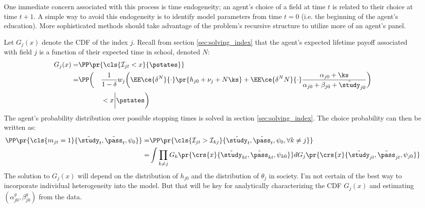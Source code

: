 One immediate concern associated with this process is time endogeneity; an agent's choice of a field at time $t$ is related to their choice at time $t+1$. A simple way to avoid this endogeneity is to identify model parameters from time $t=0$ (i.e. the beginning of the agent's education).
More sophisticated methods should take advantage of the problem's recursive structure to utilize more of an agent's panel. 

Let $G_j (x)$ denote the CDF of the index $j$. Recall from section \ref{sec:solving_index} that the agent's expected lifetime payoff associated with field $j$ is a function of their expected time in school, denoted $N$:
\begin{alignat*}{3}
    G_j(x) =& \PP \pr{\cls{\mathcal{I}_{jt} < x}{\pstates}} \span \span
    \\
    =&
    \PP \bigg(
        &&\frac{1}{1 - \delta} w_j
        \bigg(
            \EE \ce{\delta^N}{\cdot} 
            \pr{h_{j0} + \nu_j + N \ks}
            + 
            \EE \ce{\delta^N N}{\cdot} 
            \frac{\alpha_{j0} + \ks}{\alpha_{j0} + \beta_{j0} + \tilde{\study}_{j0}}
        \bigg) \\
    &&&< x \bigg\vert \pstates \bigg)
\end{alignat*}
The agent's probability distribution over possible stopping times is solved in section \ref{sec:solving_index}.
The choice probability can then be written as:
\begin{align*}
    \PP \pr{\cls{
        m_{jt} = 1
    }{\tilde{\study}_t, \tilde{\pass}_t, \psi_0}}
    =& 
    \PP \pr{\cls{
        \mathcal{I}_{jt} > \mathcal{I}_{kj}
    }{\tilde{\study}_t, \tilde{\pass}_t, \psi_0, \forall k \neq j}}
    \\
    =& 
    \int \prod_{k \neq j} 
    G_k \pr{
        \crs{x}{\tilde{\study}_{kt}, \tilde{\pass}_{kt}, \psi_{k0}}
    } d G_j \pr{
        \crs{x}{\tilde{\study}_{jt}, \tilde{\pass}_{jt}, \psi_{j0}}
    }
\end{align*}
The solution to $G_j(x)$ will depend on the distribution of $h_{j0}$ and the distribution of $\theta_j$ in society.
I'm not certain of the best way to incorporate individual heterogeneity into the model. 
But that will be key for analytically characterizing the CDF $G_j (x)$ and estimating $(\alpha_{j0}^g, \beta_{j0}^g)$ from the data.  



